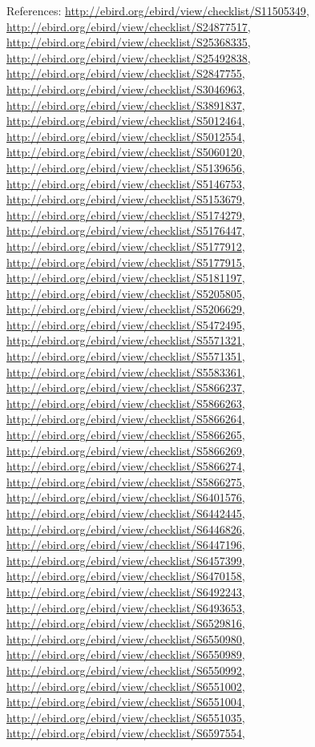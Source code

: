 \documentclass[9pt, article]{memoir}
\begin{document}
\begin{multicols}{2}
References: 
\url{http://ebird.org/ebird/view/checklist/S11505349}, 
\url{http://ebird.org/ebird/view/checklist/S24877517}, 
\url{http://ebird.org/ebird/view/checklist/S25368335}, 
\url{http://ebird.org/ebird/view/checklist/S25492838}, 
\url{http://ebird.org/ebird/view/checklist/S2847755}, 
\url{http://ebird.org/ebird/view/checklist/S3046963}, 
\url{http://ebird.org/ebird/view/checklist/S3891837}, 
\url{http://ebird.org/ebird/view/checklist/S5012464}, 
\url{http://ebird.org/ebird/view/checklist/S5012554}, 
\url{http://ebird.org/ebird/view/checklist/S5060120}, 
\url{http://ebird.org/ebird/view/checklist/S5139656}, 
\url{http://ebird.org/ebird/view/checklist/S5146753}, 
\url{http://ebird.org/ebird/view/checklist/S5153679}, 
\url{http://ebird.org/ebird/view/checklist/S5174279}, 
\url{http://ebird.org/ebird/view/checklist/S5176447}, 
\url{http://ebird.org/ebird/view/checklist/S5177912}, 
\url{http://ebird.org/ebird/view/checklist/S5177915}, 
\url{http://ebird.org/ebird/view/checklist/S5181197}, 
\url{http://ebird.org/ebird/view/checklist/S5205805}, 
\url{http://ebird.org/ebird/view/checklist/S5206629}, 
\url{http://ebird.org/ebird/view/checklist/S5472495}, 
\url{http://ebird.org/ebird/view/checklist/S5571321}, 
\url{http://ebird.org/ebird/view/checklist/S5571351}, 
\url{http://ebird.org/ebird/view/checklist/S5583361}, 
\url{http://ebird.org/ebird/view/checklist/S5866237}, 
\url{http://ebird.org/ebird/view/checklist/S5866263}, 
\url{http://ebird.org/ebird/view/checklist/S5866264}, 
\url{http://ebird.org/ebird/view/checklist/S5866265}, 
\url{http://ebird.org/ebird/view/checklist/S5866269}, 
\url{http://ebird.org/ebird/view/checklist/S5866274}, 
\url{http://ebird.org/ebird/view/checklist/S5866275}, 
\url{http://ebird.org/ebird/view/checklist/S6401576}, 
\url{http://ebird.org/ebird/view/checklist/S6442445}, 
\url{http://ebird.org/ebird/view/checklist/S6446826}, 
\url{http://ebird.org/ebird/view/checklist/S6447196}, 
\url{http://ebird.org/ebird/view/checklist/S6457399}, 
\url{http://ebird.org/ebird/view/checklist/S6470158}, 
\url{http://ebird.org/ebird/view/checklist/S6492243}, 
\url{http://ebird.org/ebird/view/checklist/S6493653}, 
\url{http://ebird.org/ebird/view/checklist/S6529816}, 
\url{http://ebird.org/ebird/view/checklist/S6550980}, 
\url{http://ebird.org/ebird/view/checklist/S6550989}, 
\url{http://ebird.org/ebird/view/checklist/S6550992}, 
\url{http://ebird.org/ebird/view/checklist/S6551002}, 
\url{http://ebird.org/ebird/view/checklist/S6551004}, 
\url{http://ebird.org/ebird/view/checklist/S6551035}, 
\url{http://ebird.org/ebird/view/checklist/S6597554}, 

\end{multicols}
\end{document}
